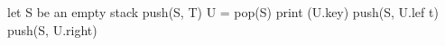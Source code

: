 \documentclass[a4paper, justified]{tufte-handout}
\begin{document}
\begin{problem}[TC 10.4-3]
\end{problem}

\begin{solution}
  \begin{algorithm}
    \begin{algorithmic}
      \State let S be an empty stack
      \State push(S, T)
      \State U = pop(S)
      \State print (U.key)
      \State push(S, U.lef t)
      \State push(S, U.right)
      \EndIf
      \EndWhile
      \EndProcedure
    \end{algorithmic}
  \end{algorithm}

\end{solution}

\begin{problem}[TC Problem 10-3]
\end{problem}
\end{document}
